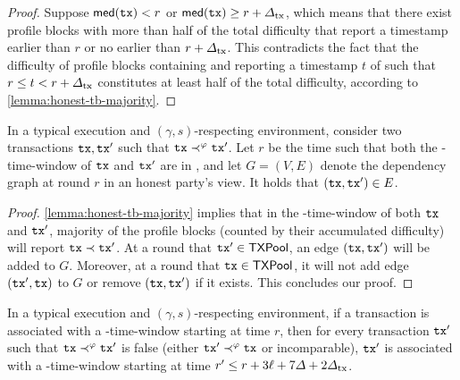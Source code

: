 \begin{proof}
    Suppose $\mathsf{med}(\mathtt{tx}) < r$ or $\mathsf{med}(\mathtt{tx}) \ge r + \varDelta_{\mathrm{tx}}$, which means that there exist profile blocks with more than half of the total difficulty that report a timestamp earlier than $r$ or no earlier than $r + \varDelta_{\mathrm{tx}}$.
    This contradicts the fact that the difficulty of profile blocks containing \tx and reporting a timestamp $t$ of \tx such that $r \le t < r + \varDelta_{\mathrm{tx}}$ constitutes at least half of the total difficulty, according to \cref{lemma:honest-tb-majority}.
\end{proof}

\begin{lemma} \label{lemma:edge-in-graph}
    In a typical execution and $(\gamma, s)$-respecting environment, consider two transactions $\mathtt{tx}, \mathtt{tx}'$ such that $\mathtt{tx} \prec^\varphi \mathtt{tx}'$.
    Let $r$ be the time such that both the \PBWindowLen-time-window of $\mathtt{tx}$ and $\mathtt{tx}'$ are in \txpool, and let $G = (V, E)$ denote the dependency graph at round $r$ in an honest party's view.
    It holds that $(\mathtt{tx}, \mathtt{tx}') \in E$.
\end{lemma}

\begin{proof}
    \cref{lemma:honest-tb-majority} implies that in the \PBWindowLen-time-window of both $\mathtt{tx}$ and $\mathtt{tx}'$, majority of the profile blocks (counted by their accumulated difficulty) will report $\mathtt{tx} \prec \mathtt{tx}'$.
    At a round that $\mathtt{tx}' \in \mathsf{TXPool}$, an edge $(\mathtt{tx} ,\mathtt{tx}')$ will be added to $G$.
    Moreover, at a round that $\mathtt{tx} \in \mathsf{TXPool}$, it will not add edge $(\mathtt{tx}', \mathtt{tx})$ to $G$ or remove $(\mathtt{tx}, \mathtt{tx}')$ if it exists.
    This concludes our proof.
\end{proof}

\begin{lemma} \label{lemma:window-apart}
    In a typical execution and $(\gamma, s)$-respecting environment, if a transaction \tx is associated with a \PBWindowLen-time-window starting at time $r$, then for every transaction $\mathtt{tx}'$ such that $\mathtt{tx} \prec^\varphi \mathtt{tx}'$ is false (either  $\mathtt{tx}' \prec^\varphi \mathtt{tx}$ or incomparable), $\mathtt{tx}'$ is associated with a \PBWindowLen-time-window starting at time $r' \le r + 3\ell + 7\varDelta + 2\varDelta_{\mathrm{tx}}$.
\end{lemma}

